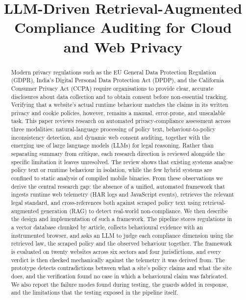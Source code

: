 \documentclass[conference]{IEEEtran}
\begin{document}
\raggedbottom

\title{LLM-Driven Retrieval-Augmented Compliance Auditing for Cloud and Web Privacy}

\author{
}
\maketitle

\begin{abstract}
Modern privacy regulations such as the EU General Data Protection Regulation (GDPR), India's Digital Personal Data Protection Act (DPDP), and the California Consumer Privacy Act (CCPA) require organisations to provide clear, accurate disclosures about data collection and to obtain consent before non-essential tracking. Verifying that a website's actual runtime behaviour matches the claims in its written privacy and cookie policies, however, remains a manual, error-prone, and unscalable task. This paper reviews research on automated privacy-compliance assessment across three modalities: natural-language processing of policy text, behaviour-to-policy inconsistency detection, and dynamic web consent auditing, together with the emerging use of large language models (LLMs) for legal reasoning. Rather than separating summary from critique, each research direction is reviewed alongside the specific limitation it leaves unresolved. The review shows that existing systems analyse policy text or runtime behaviour in isolation, while the few hybrid systems are confined to static analysis of compiled mobile binaries. From these observations we derive the central research gap: the absence of a unified, automated framework that ingests runtime web telemetry (HAR logs and JavaScript events), retrieves the relevant legal standard, and cross-references both against scraped policy text using retrieval-augmented generation (RAG) to detect real-world non-compliance. We then describe the design and implementation of such a framework. The pipeline stores regulations in a vector database chunked by article, collects behavioural evidence with an instrumented browser, and asks an LLM to judge each compliance dimension using the retrieved law, the scraped policy and the observed behaviour together. The framework is evaluated on twenty websites across six sectors and four jurisdictions, and every verdict is then checked mechanically against the telemetry it was derived from. The prototype detects contradictions between what a site's policy claims and what the site does, and the verification found no case in which a behavioural claim was fabricated. We also report the failure modes found during testing, the guards added in response, and the limitations that the testing exposed in the pipeline itself.
\end{abstract}
\end{document}
